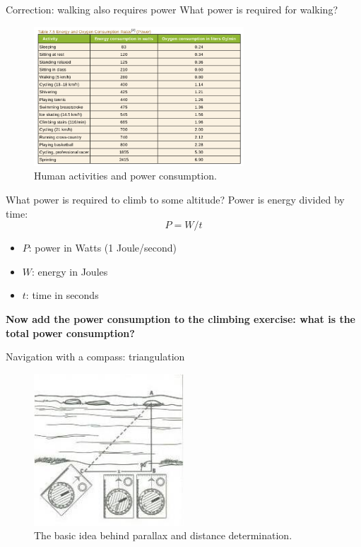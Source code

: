 \documentclass{beamer}
\begin{document}
\begin{frame}{Correction: walking also requires power}
What power is required for walking?
\begin{figure}
\centering
\includegraphics[width=0.7\textwidth]{powerTable.png}
\caption{\label{fig:power} Human activities and power consumption.}
\end{figure}
\end{frame}

\begin{frame}{What power is required to climb to some altitude?}
Power is energy divided by time:
\begin{equation}
P = W/t
\end{equation}
\begin{itemize}
\item $P$: power in Watts (1 Joule/second)
\item $W$: energy in Joules
\item $t$: time in seconds
\end{itemize}
\textbf{Now add the power consumption to the climbing exercise: what is the total power consumption?}
\end{frame}

\begin{frame}{Navigation with a compass: triangulation}
\begin{figure}
\centering
\includegraphics[width=0.5\textwidth]{Compass.jpg}
\caption{\label{fig:compass} The basic idea behind parallax and distance determination.}
\end{figure}
\end{frame}
\end{document}
